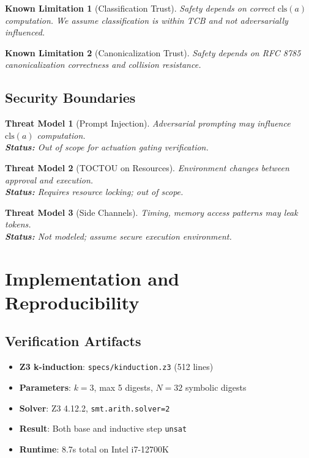 \documentclass[12pt]{article}
\newtheorem{threat}{Threat Model}[section]
\newtheorem{limitation}{Known Limitation}[section]
\begin{document}
\begin{limitation}[Classification Trust]
Safety depends on correct $\mathrm{cls}(a)$ computation. We assume classification is within TCB and not adversarially influenced.
\end{limitation}

\begin{limitation}[Canonicalization Trust]
Safety depends on RFC 8785 canonicalization correctness and collision resistance.
\end{limitation}

\subsection{Security Boundaries}

\begin{threat}[Prompt Injection]
Adversarial prompting may influence $\mathrm{cls}(a)$ computation.\\
\textbf{Status:} Out of scope for actuation gating verification.
\end{threat}

\begin{threat}[TOCTOU on Resources]
Environment changes between approval and execution.\\
\textbf{Status:} Requires resource locking; out of scope.
\end{threat}

\begin{threat}[Side Channels]
Timing, memory access patterns may leak tokens.\\
\textbf{Status:} Not modeled; assume secure execution environment.
\end{threat}

\section{Implementation and Reproducibility}

\subsection{Verification Artifacts}

\begin{itemize}
    \item \textbf{Z3 k-induction}: \texttt{specs/kinduction.z3} (512 lines)
    \item \textbf{Parameters}: $k=3$, max 5 digests, $N=32$ symbolic digests
    \item \textbf{Solver}: Z3 4.12.2, \texttt{smt.arith.solver=2}
    \item \textbf{Result}: Both base and inductive step \texttt{unsat}
    \item \textbf{Runtime}: 8.7s total on Intel i7-12700K
\end{itemize}
\end{document}
